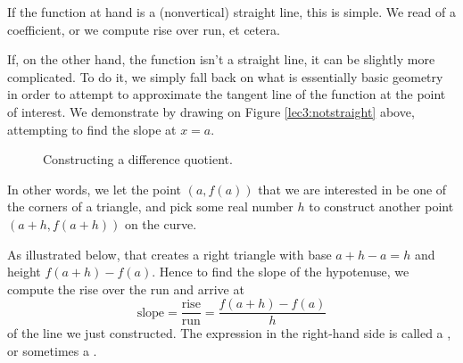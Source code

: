 \noindent
If the function at hand is a (nonvertical) straight line, this is simple.
We read of a coefficient, or we compute rise over run, et cetera.

If, on the other hand, the function isn't a straight line, it can be slightly more complicated.
To do it, we simply fall back on what is essentially basic geometry in order to attempt to approximate the tangent line of the function at the point of interest.
We demonstrate by drawing on Figure \ref{lec3:notstraight} above, attempting to find the slope at $x = a$.

\begin{figure}
	\centering
	\hfill
	\caption{Constructing a difference quotient.}
\end{figure}

In other words, we let the point $(a, f(a))$ that we are interested in be one of the corners of a triangle, and pick some real number $h$ to construct another point $(a + h, f(a + h))$ on the curve.

As illustrated below, that creates a right triangle with base $a + h - a = h$ and height $f(a + h) - f(a)$. Hence to find the slope of the hypotenuse, we compute the rise over the run and arrive at
\[
	\text{slope} = \frac{\text{rise}}{\text{run}} = \frac{f(a + h) - f(a)}{h}
\]
of the line we just constructed.
The expression in the right-hand side is called a , or sometimes a .


